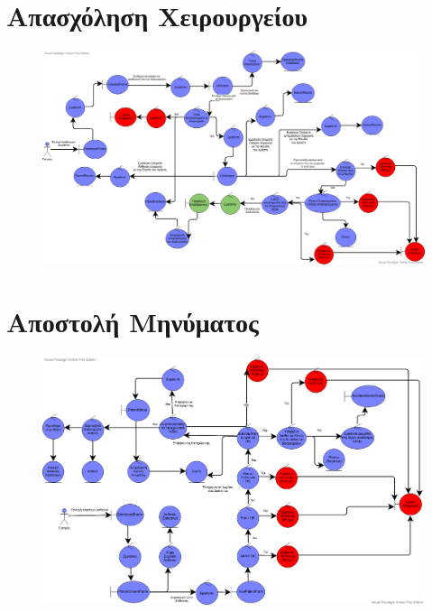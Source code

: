 \documentclass{article}
\begin{document}
\newpage

\section{Απασχόληση Χειρουργείου}

\vspace{0.2cm}

\begin{figure}[!htb]
        \centering
        \includegraphics[width=1.1\textwidth]{OR Occupation.png}
\end{figure}

\newpage

\section{Αποστολή Μηνύματος}

\vspace{0.2cm}

\begin{figure}[!htb]
        \centering
        \includegraphics[width=1\textwidth]{Messages.png}
\end{figure}
\end{document}
